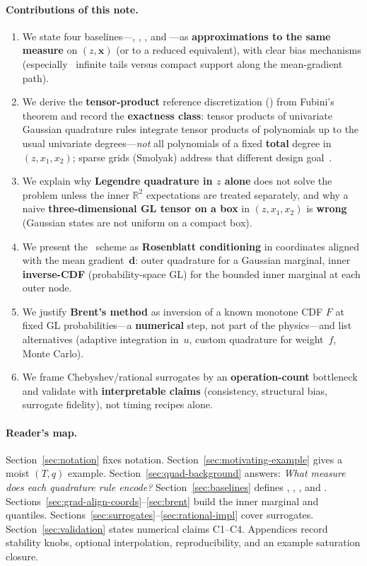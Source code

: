 \documentclass[11pt,a4paper]{article}
\begin{document}
\paragraph{Contributions of this note.}
\begin{enumerate}
  \item We state four baselines---\centeronly, \momentmatched, \columntensor, and \profileros---as \textbf{approximations to the same measure} on $(z,\mathbf{x})$ (or to a reduced equivalent), with clear bias mechanisms (especially \momentmatched\ infinite tails versus compact support along the mean-gradient path).
  \item We derive the \textbf{tensor-product} reference discretization (\columntensor) from Fubini's theorem and record the \textbf{exactness class}: tensor products of univariate Gaussian quadrature rules integrate tensor products of polynomials up to the usual univariate degrees---\emph{not} all polynomials of a fixed \textbf{total} degree in $(z,x_1,x_2)$; sparse grids (Smolyak) address that different design goal~\cite{gerstner}.
  \item We explain why \textbf{Legendre quadrature in $z$ alone} does not solve the problem unless the inner $\mathbb{R}^2$ expectations are treated separately, and why a naive \textbf{three-dimensional GL tensor on a box} in $(z,x_1,x_2)$ is \textbf{wrong} (Gaussian states are not uniform on a compact box).
  \item We present the \profileros\ scheme as \textbf{Rosenblatt conditioning} in coordinates aligned with the mean gradient~$\mathbf{d}$: outer quadrature for a Gaussian marginal, inner \textbf{inverse-CDF} (probability-space GL) for the bounded inner marginal at each outer node.
  \item We justify \textbf{Brent's method} as inversion of a known monotone CDF $F$ at fixed GL probabilities---a \textbf{numerical} step, not part of the physics---and list alternatives (adaptive integration in~$u$, custom quadrature for weight~$f$, Monte Carlo).
  \item We frame Chebyshev/rational surrogates by an \textbf{operation-count} bottleneck and validate with \textbf{interpretable claims} (consistency, structural bias, surrogate fidelity), not timing recipes alone.
\end{enumerate}

\paragraph{Reader's map.}
Section~\ref{sec:notation} fixes notation.
Section~\ref{sec:motivating-example} gives a moist $(T,q)$ example.
Section~\ref{sec:quad-background} answers: \emph{What measure does each quadrature rule encode?}
Section~\ref{sec:baselines} defines \centeronly, \momentmatched, \columntensor, and \profileros.
Sections~\ref{sec:grad-align-coords}--\ref{sec:brent} build the inner marginal and quantiles.
Sections~\ref{sec:surrogates}--\ref{sec:rational-impl} cover surrogates.
Section~\ref{sec:validation} states numerical claims C1--C4.
Appendices record stability knobs, optional interpolation, reproducibility, and an example saturation closure.
\end{document}
